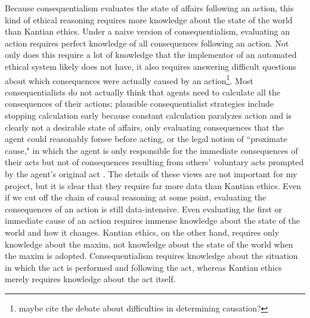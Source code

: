 \begin{isabellebody}
\begin{isamarkuptext}
Because consequentialism evaluates the state of affairs following an action, this kind of  ethical 
reasoning requires more knowledge
about the state of the world than Kantian ethics. Under a naive version of consequentialism, evaluating 
an action requires perfect knowledge of all consequences following an action. Not only does this require 
a lot of knowledge that the implementor of an automated ethical system likely does not have, it also 
requires answering difficult questions about which consequences were actually caused by an action\footnote
{maybe cite the debate about difficulties in determining causation?}. Most consequentialists do not actually
think that agents need to calculate all the consequences of their actions; plausible consequentialist strategies include stopping 
calculation early because constant calculation paralyzes action and is clearly not a desirable state of affairs,
only evaluating consequences that the agent could reasonably forsee before acting, or the legal notion 
of ``proximate cause," in which the agent is only responsible for the immediate consequences of their 
acts but not of consequences resulting from others' voluntary acts prompted by the agent's original act \cite{consequentialismsep}.
The details of these views are not important for my project, but it is clear that they require far 
more data than Kantian ethics. Even if we cut off the chain of causal reasoning at some point, evaluating 
the consequences of an action is still data-intensive. Even evaluating the first or immediate cause of an
action requires immense knowledge about the state of the world and how it changes. Kantian ethics, on the 
other hand, requires only knowledge about the maxim, not knowledge about the state of the world when 
the maxim is adopted. Consequentialism requires knowledge about the situation in which the act is 
performed and following the act, whereas Kantian ethics merely requires knowledge about the act itself.


\end{isamarkuptext}
\end{isabellebody}
